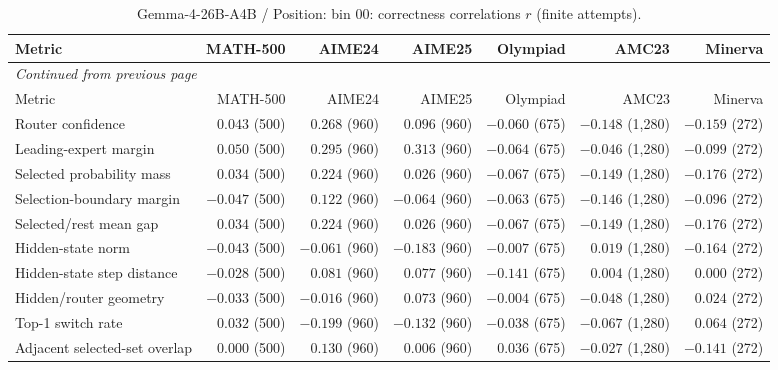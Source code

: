 \begingroup\scriptsize\setlength{\tabcolsep}{4pt}
\begin{longtable}{@{}lrrrrrr@{}}
\caption{Gemma-4-26B-A4B / Position: bin 00: correctness correlations $r$ (finite attempts).}\label{tab:multi-gemma-position-bin_00}\\
\toprule
Metric & MATH-500 & AIME24 & AIME25 & Olympiad & AMC23 & Minerva \\
\midrule\endfirsthead
\multicolumn{7}{l}{\textit{Continued from previous page}}\\
\toprule
Metric & MATH-500 & AIME24 & AIME25 & Olympiad & AMC23 & Minerva \\
\midrule\endhead
\bottomrule\endfoot
Router confidence & $0.043$ (500) & $0.268$ (960) & $0.096$ (960) & $-0.060$ (675) & $-0.148$ (1,280) & $-0.159$ (272) \\
Leading-expert margin & $0.050$ (500) & $0.295$ (960) & $0.313$ (960) & $-0.064$ (675) & $-0.046$ (1,280) & $-0.099$ (272) \\
Selected probability mass & $0.034$ (500) & $0.224$ (960) & $0.026$ (960) & $-0.067$ (675) & $-0.149$ (1,280) & $-0.176$ (272) \\
Selection-boundary margin & $-0.047$ (500) & $0.122$ (960) & $-0.064$ (960) & $-0.063$ (675) & $-0.146$ (1,280) & $-0.096$ (272) \\
Selected/rest mean gap & $0.034$ (500) & $0.224$ (960) & $0.026$ (960) & $-0.067$ (675) & $-0.149$ (1,280) & $-0.176$ (272) \\
Hidden-state norm & $-0.043$ (500) & $-0.061$ (960) & $-0.183$ (960) & $-0.007$ (675) & $0.019$ (1,280) & $-0.164$ (272) \\
Hidden-state step distance & $-0.028$ (500) & $0.081$ (960) & $0.077$ (960) & $-0.141$ (675) & $0.004$ (1,280) & $0.000$ (272) \\
Hidden/router geometry & $-0.033$ (500) & $-0.016$ (960) & $0.073$ (960) & $-0.004$ (675) & $-0.048$ (1,280) & $0.024$ (272) \\
Top-1 switch rate & $0.032$ (500) & $-0.199$ (960) & $-0.132$ (960) & $-0.038$ (675) & $-0.067$ (1,280) & $0.064$ (272) \\
Adjacent selected-set overlap & $0.000$ (500) & $0.130$ (960) & $0.006$ (960) & $0.036$ (675) & $-0.027$ (1,280) & $-0.141$ (272) \\
\end{longtable}\endgroup

